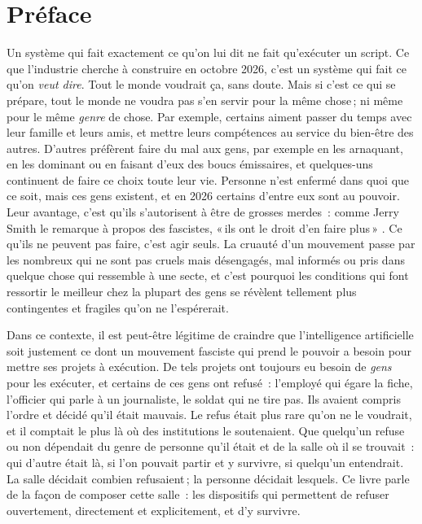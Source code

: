\chapter*{Préface}
Un système qui fait exactement ce qu'on lui dit ne fait qu'exécuter un script. Ce que l'industrie cherche à construire en octobre 2026, c'est un système qui fait ce qu'on \emph{veut dire}. Tout le monde voudrait ça, sans doute. Mais si c'est ce qui se prépare, tout le monde ne voudra pas s'en servir pour la même chose\,; ni même pour le même \emph{genre} de chose. Par exemple, certains aiment passer du temps avec leur famille et leurs amis, et mettre leurs compétences au service du bien-être des autres. D'autres préfèrent faire du mal aux gens, par exemple en les arnaquant, en les dominant ou en faisant d'eux des boucs émissaires, et quelques-uns continuent de faire ce choix toute leur vie. Personne n'est enfermé dans quoi que ce soit, mais ces gens existent, et en 2026 certains d'entre eux sont au pouvoir. Leur avantage, c'est qu'ils s'autorisent à être de grosses merdes~: comme Jerry Smith le remarque à propos des fascistes, «\,ils ont le droit d'en faire plus\,» \autocite{rickandmorty2023}. Ce qu'ils ne peuvent pas faire, c'est agir seuls. La cruauté d'un mouvement passe par les nombreux qui ne sont pas cruels mais désengagés, mal informés ou pris dans quelque chose qui ressemble à une secte, et c'est pourquoi les conditions qui font ressortir le meilleur chez la plupart des gens se révèlent tellement plus contingentes et fragiles qu'on ne l'espérerait.

Dans ce contexte, il est peut-être légitime de craindre que l'intelligence artificielle soit justement ce dont un mouvement fasciste qui prend le pouvoir a besoin pour mettre ses projets à exécution. De tels projets ont toujours eu besoin de \emph{gens} pour les exécuter, et certains de ces gens ont refusé~: l'employé qui égare la fiche, l'officier qui parle à un journaliste, le soldat qui ne tire pas. Ils avaient compris l'ordre et décidé qu'il était mauvais. Le refus était plus rare qu'on ne le voudrait, et il comptait le plus là où des institutions le soutenaient. Que quelqu'un refuse ou non dépendait du genre de personne qu'il était et de la salle où il se trouvait~: qui d'autre était là, si l'on pouvait partir et y survivre, si quelqu'un entendrait. La salle décidait combien refusaient\,; la personne décidait lesquels. Ce livre parle de la façon de composer cette salle~: les dispositifs qui permettent de refuser ouvertement, directement et explicitement, et d'y survivre.

